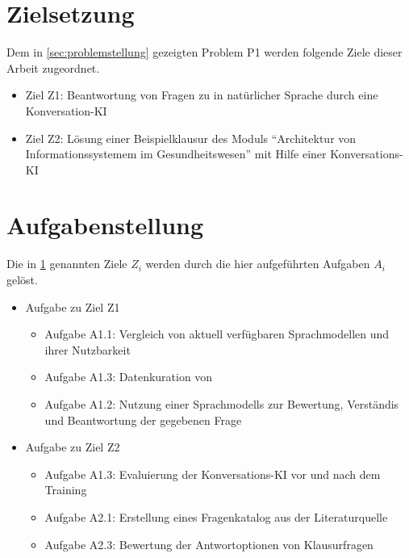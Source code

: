 \section{Zielsetzung}\label{sec:zielsetzung}

Dem in \ref{sec:problemstellung} gezeigten Problem P1 werden folgende Ziele dieser Arbeit zugeordnet.
\begin{itemize}
  \item Ziel Z1: Beantwortung von Fragen zu \citet{bb} in natürlicher Sprache durch eine Konversation-KI
  \item Ziel Z2: Lösung einer Beispielklausur des Moduls \enquote{Architektur von Informationssystemem im Gesundheitswesen} mit Hilfe einer Konversations-KI
\end{itemize}

\section{Aufgabenstellung}

Die in \ref{sec:zielsetzung} genannten Ziele $Z_i$ werden durch die hier aufgeführten Aufgaben $A_i$ gelöst.

\begin{itemize}
  \item Aufgabe zu Ziel Z1
  \begin{itemize}
    \item Aufgabe A1.1: Vergleich von aktuell verfügbaren Sprachmodellen und ihrer Nutzbarkeit
    \item Aufgabe A1.3: Datenkuration von \citet{bb}
    \item Aufgabe A1.2: Nutzung einer Sprachmodells zur Bewertung, Verständis und Beantwortung der gegebenen Frage
  \end{itemize}
  \item Aufgabe zu Ziel Z2
  \begin{itemize}
    \item Aufgabe A1.3: Evaluierung der Konversations-KI vor und nach dem Training
    \item Aufgabe A2.1: Erstellung eines Fragenkatalog aus der Literaturquelle
    \item Aufgabe A2.3: Bewertung der Antwortoptionen von Klausurfragen
  \end{itemize}
\end{itemize}

